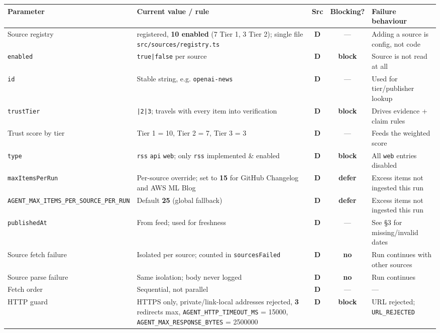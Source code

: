 \documentclass[10pt,a4paper]{article}
\newcommand{\vr}[1]{\texttt{\footnotesize\hyphenpenalty=0\exhyphenpenalty=0\relax #1}}
\newcommand{\cd}[1]{\texttt{\footnotesize\hyphenpenalty=0\exhyphenpenalty=0\relax #1}}
\newcommand{\us}{\_\discretionary{}{}{}}
\newcommand{\D}{\textcolor{go}{\textbf{D}}}
\newcommand{\BL}{\textcolor{st}{\textbf{block}}}
\newcommand{\DF}{\textcolor{hd}{\textbf{defer}}}
\begin{document}
\begin{center}\footnotesize
\begin{tabularx}{\textwidth}{@{}>{\RaggedRight}p{3.5cm} >{\RaggedRight}X c c >{\RaggedRight}p{4.1cm}@{}}
\toprule
\textbf{Parameter} & \textbf{Current value / rule} & \textbf{Src} & \textbf{Blocking?} & \textbf{Failure behaviour} \\
\midrule
Source registry & 17 registered, \textbf{10 enabled} (7 Tier 1, 3 Tier 2); single file \cd{src/sources/registry.ts} & \D & --- & Adding a source is config, not code \\
\cd{enabled} & \cd{true|false} per source & \D & \BL & Source is not read at all \\
\cd{id} & Stable string, e.g. \cd{openai-news} & \D & --- & Used for tier/publisher lookup \\
\cd{trustTier} & \cd{1|2|3}; travels with every item into verification & \D & \BL & Drives evidence + claim rules \\
Trust score by tier & Tier 1 = 10, Tier 2 = 7, Tier 3 = 3 & \D & --- & Feeds the weighted score \\
\cd{type} & \cd{rss} \textbar{} \cd{api} \textbar{} \cd{web}; only \cd{rss} implemented \& enabled & \D & \BL & All \cd{web} entries disabled \\
\cd{maxItemsPerRun} & Per-source override; set to \textbf{15} for GitHub Changelog and AWS ML Blog & \D & \DF & Excess items not ingested this run \\
\vr{AGENT\us MAX\us ITEMS\us PER\us SOURCE\us PER\us RUN} & Default \textbf{25} (global fallback) & \D & \DF & Excess items not ingested this run \\
\cd{publishedAt} & From feed; used for freshness & \D & --- & See \S3 for missing/invalid dates \\
Source fetch failure & Isolated per source; counted in \cd{sourcesFailed} & \D & \textbf{no} & Run continues with other sources \\
Source parse failure & Same isolation; body never logged & \D & \textbf{no} & Run continues \\
Fetch order & Sequential, not parallel & \D & --- & --- \\
HTTP guard & HTTPS only, private/link-local addresses rejected, \textbf{3} redirects max, \vr{AGENT\us HTTP\us TIMEOUT\us MS} = 15000, \vr{AGENT\us MAX\us RESPONSE\us BYTES} = 2500000 & \D & \BL & URL rejected; \cd{URL\us REJECTED} \\
\bottomrule
\end{tabularx}
\end{center}
\end{document}
